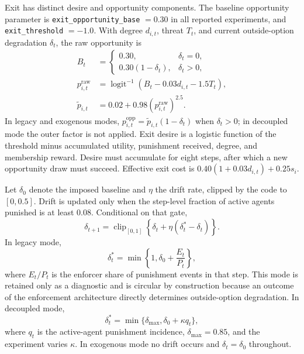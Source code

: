 Exit has distinct desire and opportunity components. The baseline opportunity parameter is \texttt{exit\_opportunity\_base} \(=0.30\) in all reported experiments, and \texttt{exit\_threshold} \(=-1.0\). With degree \(d_{i,t}\), threat \(T_t\), and current outside-option degradation \(\delta_t\), the raw opportunity is
\begin{align}
 B_t&=\begin{cases}0.30,&\delta_t=0,\\0.30(1-\delta_t),&\delta_t>0,\end{cases}\\
 p^{\mathrm{raw}}_{i,t}&=\operatorname{logit}^{-1}(B_t-0.03d_{i,t}-1.5T_t),\\
 \widetilde p_{i,t}&=0.02+0.98\left(p^{\mathrm{raw}}_{i,t}\right)^{2.5}.
\end{align}
In legacy and exogenous modes, \(p^{\mathrm{opp}}_{i,t}=\widetilde p_{i,t}(1-\delta_t)\) when \(\delta_t>0\); in decoupled mode the outer factor is not applied. Exit desire is a logistic function of the threshold minus accumulated utility, punishment received, degree, and membership reward. Desire must accumulate for eight steps, after which a new opportunity draw must succeed. Effective exit cost is \(0.40(1+0.03d_{i,t})+0.25s_i\).

Let \(\delta_0\) denote the imposed baseline and \(\eta\) the drift rate, clipped by the code to \([0,0.5]\). Drift is updated only when the step-level fraction of active agents punished is at least 0.08. Conditional on that gate,
\begin{equation}
 \delta_{t+1}=\operatorname{clip}_{[0,1]}\left\{\delta_t+\eta(\delta_t^{*}-\delta_t)\right\}.
\end{equation}
In legacy mode,
\begin{equation}
 \delta_t^{*}=\min\left\{1,\delta_0+\frac{E_t}{P_t}\right\},
\end{equation}
where \(E_t/P_t\) is the enforcer share of punishment events in that step. This mode is retained only as a diagnostic and is circular by construction because an outcome of the enforcement architecture directly determines outside-option degradation. In decoupled mode,
\begin{equation}
 \delta_t^{*}=\min\{\delta_{\max},\delta_0+\kappa q_t\},
\end{equation}
where \(q_t\) is the active-agent punishment incidence, \(\delta_{\max}=0.85\), and the experiment varies \(\kappa\). In exogenous mode no drift occurs and \(\delta_t=\delta_0\) throughout.


